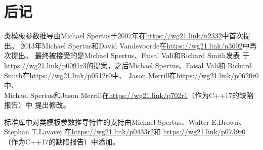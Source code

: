 \section{后记}
类模板参数推导由Michael Spertus于2007年在\url{https://wg21.link/n2332}中首次提出。
2013年Michael Spertus和David Vandevoorde在\url{https://wg21.link/n3602}中再次提出。
最终被接受的是Michael Spertus、Faisal Vali和Richard Smith发表
于\url{https://wg21.link/p0091r3}的提案，之后Michael Spertus、Faisal Vali和
Richard Smith在\url{https://wg21.link/p0512r0}中、
Jason Merrill在\url{https://wg21.link/p0620r0}中、\\
Michael Spertus和Jason Merrill在\url{https://wg21.link/p702r1}（作为C++17的缺陷报告）中
提出修改。

标准库中对类模板参数推导特性的支持由Michael Spertus、Walter E.Brown、Stephan T.Lavavej
在\url{https://wg21.link/p0433r2}和
\url{https://wg21.link/p0739r0}（作为C++17的缺陷报告）中添加。